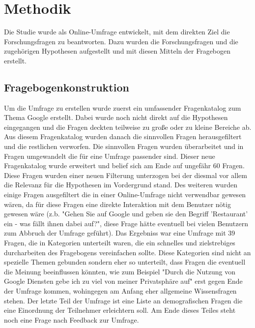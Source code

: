 %
% 

\chapter{Methodik}

Die Studie wurde als Online-Umfrage entwickelt, mit dem direkten Ziel die Forschungsfragen zu beantworten. Dazu wurden die Forschungsfragen und die zugehörigen Hypothesen aufgestellt und mit diesen Mitteln der Fragebogen erstellt.

\section{Fragebogenkonstruktion}
Um die Umfrage zu erstellen wurde zuerst ein umfassender Fragenkatalog zum Thema Google erstellt. Dabei wurde noch nicht direkt auf die Hypothesen eingegangen und die Fragen deckten teilweise zu große oder zu kleine Bereiche ab. Aus diesem Fragenkatalog wurden danach die sinnvollen Fragen herausgefiltert und die restlichen verworfen. Die sinnvollen Fragen wurden überarbeitet und in Fragen umgewandelt die für eine Umfrage passender sind. Dieser neue Fragenkatalog wurde erweitert und belief sich am Ende auf ungefähr 60 Fragen.
Diese Fragen wurden einer neuen Filterung unterzogen bei der diesmal vor allem die Relevanz für die Hypothesen im Vordergrund stand. Des weiteren wurden einige Fragen ausgefiltert die in einer Online-Umfrage nicht verwendbar gewesen wären, da für diese Fragen eine direkte Interaktion mit dem Benutzer nötig gewesen wäre (z.b. "Gehen Sie auf Google und geben sie den Begriff 'Restaurant' ein - was fällt ihnen dabei auf?", diese Frage hätte eventuell bei vielen Benutzern zum Abbruch der Umfrage geführt). Das Ergebniss war eine Umfrage mit 39 Fragen, die in Kategorien unterteilt waren, die ein schnelles und zielstrebiges durcharbeiten des Fragebogens vereinfachen sollte. Diese Kategorien sind nicht an spezielle Themen gebunden sondern eher so unterteilt, dass Fragen die eventuell die Meinung beeinflussen könnten, wie zum Beispiel "Durch die Nutzung von Google Diensten gebe ich zu viel von meiner Privatsphäre auf" erst gegen Ende der Umfrage kommen, wohingegen am Anfang eher allgemeine Wissensfragen stehen.
Der letzte Teil der Umfrage ist eine Liste an demografischen Fragen die eine Einordnung der Teilnehmer erleichtern soll. Am Ende dieses Teiles steht noch eine Frage nach Feedback zur Umfrage.
